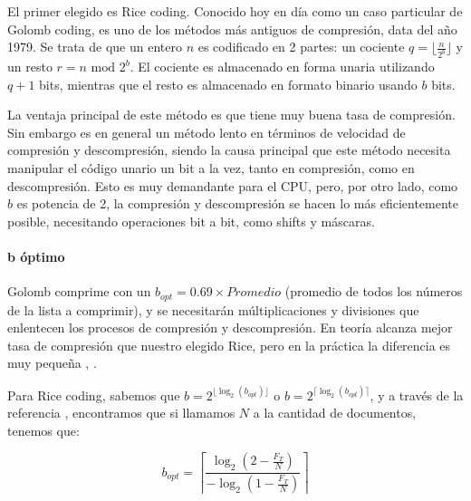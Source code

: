 El primer elegido es Rice coding. Conocido hoy en día como un caso particular de Golomb coding, es uno de los métodos más antiguos de compresión, data del año 1979. Se trata de que un entero $n$ es codificado en 2 partes: un cociente $q = \lfloor \frac{n}{2^b} \rfloor$ y un resto 
$r = n \text{ mod } 2^b$. El cociente es almacenado en forma unaria utilizando $q+1$ bits, mientras que el resto es almacenado en formato binario usando $b$ bits. 



La ventaja principal de este método es que tiene muy buena tasa de compresión. Sin embargo es en general un método lento en términos de velocidad de compresión y descompresión, siendo la causa principal que este método necesita manipular el código unario un bit a la vez, tanto en compresión, como en descompresión. Esto es muy demandante para el CPU, pero, por otro lado, como $b$ es potencia de 2, la compresión y descompresión se hacen lo más eficientemente posible, necesitando operaciones bit a bit, como shifts y máscaras. 

\paragraph{b óptimo}

Golomb comprime con un $b_{opt}= 0.69 \times Promedio$ (promedio de todos los números de la lista a comprimir), y se necesitarán múltiplicaciones y divisiones que enlentecen los procesos de compresión y descompresión. En teoría alcanza mejor tasa de compresión que nuestro elegido Rice, pero en la práctica la diferencia es muy pequeña \cite{Zhang:2008}, \cite{Buettcher2010}.

Para Rice coding, sabemos que $b=2^{\lfloor \log_2{(b_{opt})} \rfloor}$ o $b=2^{\lceil \log_2{(b_{opt})} \rceil}$, y a través de la referencia \cite[p.~200]{Buettcher2010}, encontramos que si llamamos $N$ a la cantidad de documentos, tenemos que:

\[ b_{opt} = \left\lceil \frac{\log_2{(2-\frac{F_T}{N})}}{-\log_2{(1-\frac{F_T}{N})}}  \right\rceil\]



